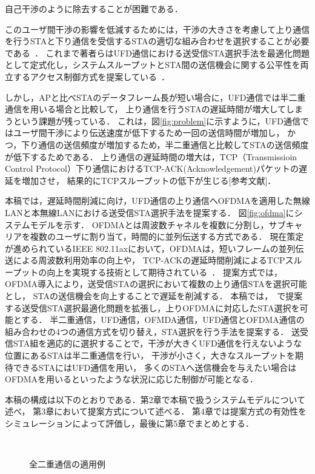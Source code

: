 \documentclass[technicalreport]{ieicej}
\begin{document}
	自己干渉のように除去することが困難である．
	\par
	このユーザ間干渉の影響を低減するためには，干渉の大きさを考慮して上り通信を行うSTAと下り通信を受信するSTAの適切な組み合わせを選択することが必要である~\cite{promac}．
	これまで著者らはUFD通信における送受信STA選択手法を最適化問題として定式化し，システムスループットとSTA間の送信機会に関する公平性を両立するアクセス制御方式を提案している~\cite{promac_fair}．
	\par
	しかし，APと比べSTAのデータフレーム長が短い場合に，UFD通信では半二重通信を用いる場合と比較して，
	上り通信を行うSTAの遅延時間が増大してしまうという課題が残っている．
	これは，図\ref{fig:problem}に示すように，UFD通信ではユーザ間干渉により伝送速度が低下するため一回の送信時間が増加し，
	かつ，下り通信の送信頻度が増加するため，半二重通信と比較してSTAの送信頻度が低下するためである．
	上り通信の遅延時間の増大は，TCP（Transmissioin Control Protocol）下り通信におけるTCP-ACK(Acknowledgement)パケットの遅延を増加させ，
	結果的にTCPスループットの低下が生じる[参考文献]．
	\par
	本稿では，遅延時間削減に向け，UFD通信の上り通信へOFDMAを適用した無線LANと本無線LANにおける送受信STA選択手法を提案する．
	図\ref{fig:ofdma}にシステムモデルを示す．
	OFDMAとは周波数チャネルを複数に分割し，サブキャリアを複数のユーザに割り当て，時間的に並列伝送する方式である．
	現在策定が進められているIEEE 802.11axにおいて，OFDMAは，短いフレームの並列伝送による周波数利用効率の向上や，
	TCP-ACKの遅延時間削減によるTCPスループットの向上を実現する技術として期待されている~\cite{ofdma}．
	提案方式では，OFDMA導入により，送受信STAの選択において複数の上り通信STAを選択可能とし，
	STAの送信機会を向上することで遅延を削減する．
	本稿では，~\cite{promac_fair}で提案する送受信STA選択最適化問題を拡張し，上りOFDMAに対応したSTA選択を可能とする．
	半二重通信，UFD通信，OFMDA通信，UFD通信とOFDMA通信の組み合わせの4つの通信方式を切り替え，STA選択を行う手法を提案する．
	送受信STA組を適応的に選択することで，干渉が大きくUFD通信を行えないような位置にあるSTAは半二重通信を行い，
	干渉が小さく，大きなスループットを期待できるSTAにはUFD通信を用い，
	多くのSTAへ送信機会を与えたい場合はOFDMAを用いるといったような状況に応じた制御が可能となる．
	\par
	本稿の構成は以下のとおりである．第2章で本稿で扱うシステムモデルについて述べ，
	第3章において提案方式について述べる．
	第4章では提案方式の有効性をシミュレーションによって評価し，最後に第5章でまとめとする．

	\begin{figure}[t]
		\centering
		\\
		\caption{全二重通信の適用例}
		\label{fig:topology}
	\end{figure}
\end{document}

